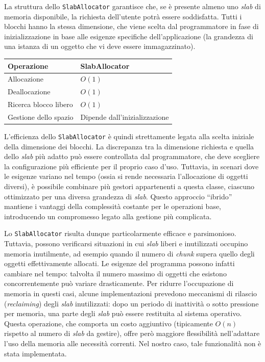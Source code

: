 La struttura dello \texttt{SlabAllocator} garantisce che, se è presente almeno uno \textit{slab} di memoria disponibile, la richiesta dell’utente potrà essere soddisfatta. Tutti i blocchi hanno la stessa dimensione, che viene scelta dal programmatore in fase di inizializzazione in base alle esigenze specifiche dell’applicazione (la grandezza di una istanza di un oggetto che vi deve essere immagazzinato).

\begin{center}
\begin{tabular}{|l|p{8cm}|}
\hline
Operazione & SlabAllocator \\
\hline
Allocazione & $O(1)$ \\
Deallocazione & $O(1)$ \\
Ricerca blocco libero & $O(1)$ \\
Gestione dello spazio & Dipende dall'inizializzazione \\
\hline
\end{tabular}
\end{center}

L’efficienza dello \texttt{SlabAllocator} è quindi strettamente legata alla scelta iniziale della dimensione dei blocchi. La discrepanza tra la dimensione richiesta e quella dello \textit{slab} più adatto può essere controllata dal programmatore, che deve scegliere la configurazione più efficiente per il proprio caso d’uso.
Tuttavia, in scenari dove le esigenze variano nel tempo (ossia si rende necessaria l’allocazione di oggetti diversi), è possibile combinare più gestori appartenenti a questa classe, ciascuno ottimizzato per una diversa grandezza di \textit{slab}. Questo approccio “ibrido” mantiene i vantaggi della complessità costante per le operazioni base, introducendo un compromesso legato alla gestione più complicata. 

Lo \texttt{SlabAllocator} risulta dunque particolarmente efficace e parsimonioso. Tuttavia, possono verificarsi situazioni in cui \textit{slab} liberi e inutilizzati occupino memoria inutilmente, ad esempio quando il numero di \textit{chunk} supera quello degli oggetti effettivamente allocati. Le esigenze del programma possono infatti cambiare nel tempo: talvolta il numero massimo di oggetti che esistono concorrentemente può variare drasticamente. Per ridurre l’occupazione di memoria in questi casi, alcune implementazioni prevedono meccanismi di rilascio (\textit{reclaiming}) degli \textit{slab} inutilizzati: dopo un periodo di inattività o sotto pressione per memoria, una parte degli \textit{slab} può essere restituita al sistema operativo. Questa operazione, che comporta un costo aggiuntivo (tipicamente $O(n)$ rispetto al numero di \textit{slab} da gestire), offre però maggiore flessibilità nell’adattare l’uso della memoria alle necessità correnti. Nel nostro caso, tale funzionalità non è stata implementata.

